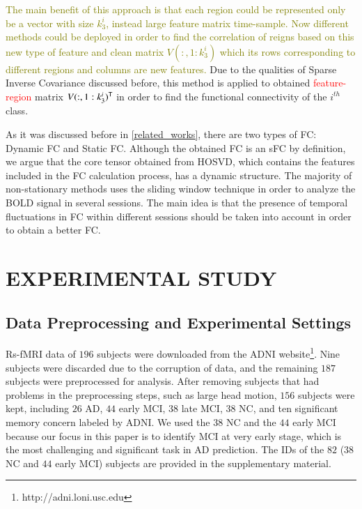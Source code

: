 \documentclass[preprint,12pt]{elsarticle}
\begin{document}
\textcolor{olive}{The main benefit of this approach is that each
	region could be represented only be a vector with size $k_3^i$, instead large feature matrix  time-sample. Now different methods could be deployed in order to find the correlation of reigns based on this new type of feature and clean matrix $V(:,1:k_{3}^i)$ which its rows corresponding to different regions and columns are new features.} Due to the qualities of Sparse Inverse Covariance discussed before, this method is applied to obtained  \textcolor{red}{feature-region} matrix  $V(:,1:k_3^i)^{\sf T}$  in order to find the functional connectivity of the $i^{th}$ class.


As it was discussed before in \eqref{related_works}, there are two types of FC: Dynamic FC and Static FC. Although the obtained FC is an sFC by definition, we argue that the core tensor obtained from HOSVD, which contains the features included in the FC calculation process, has a dynamic structure. The majority of non-stationary methods uses the sliding window technique in order to analyze the BOLD signal in several sessions. The main idea is that the presence of temporal fluctuations in FC within different sessions should be taken into account in order to obtain a better FC.

\section{EXPERIMENTAL STUDY}
\subsection{Data Preprocessing and Experimental Settings}

Rs-fMRI data of $196$ subjects were downloaded from the ADNI website\footnote{http://adni.loni.usc.edu}. Nine subjects were discarded
due to the corruption of data, and the remaining $187$ subjects were preprocessed for analysis. After removing subjects that had problems in the preprocessing steps, such as large head motion,
$156$ subjects were kept, including $26$ AD, $44$ early MCI, $38$ late MCI, $38$ NC, and ten significant memory concern labeled by ADNI. We used the $38$ NC and the $44$ early MCI because our focus in this paper is to identify MCI at very early stage, which is the most challenging and significant task in AD
prediction. The IDs of the $82$ ($38$ NC and $44$ early MCI) subjects are provided in the supplementary material. 
\end{document}
